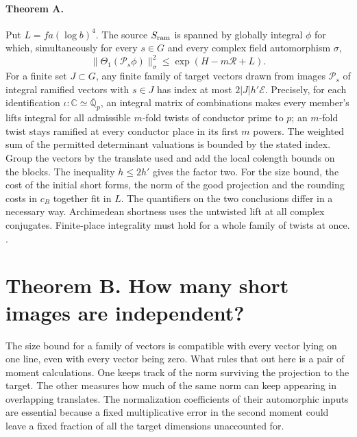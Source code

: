 \paragraph{Theorem A.} Put \(L=fa(\log b)^4\). The source \(S_{\rm ram}\) is spanned by globally integral \(\phi\) for which, simultaneously for every \(s\in G\) and every complex field automorphism \(\sigma\),
\begin{equation}\label{eq:bridge-short}
              \|\Theta_1(\mathcal P_s\phi)\|_\sigma^2
                        \le \exp(H-m\mathcal R+L).
\end{equation}
For a finite set \(J\subset G\), any finite family of target vectors drawn from images \(\mathcal P_s\) of integral ramified vectors with \(s\in J\) has index at most \(2|J|h'\mathcal E\). Precisely, for each identification \(\iota:\mathbb C\simeq\overline{\mathbb Q}_p\), an integral matrix of combinations makes every member's lifts integral for all admissible \(m\)-fold twists of conductor prime to \(p\); an \(m\)-fold twist stays ramified at every conductor place in its first \(m\) powers. The weighted sum of the permitted determinant valuations is bounded by the stated index. Group the vectors by the translate used and add the local colength bounds on the blocks. The inequality \(h\le2h'\) gives the factor two. For the size bound, the cost of the initial short forms, the norm of the good projection and the rounding costs in \(c_B\) together fit in \(L\). The quantifiers on the two conclusions differ in a necessary way. Archimedean shortness uses the untwisted lift at all complex conjugates. Finite-place integrality must hold for a whole family of twists at once. .

\section{Theorem B. How many short images are independent?}\label{sec:bridge-enough}

The size bound for a family of vectors is compatible with every vector lying on one line, even with every vector being zero. What rules that out here is a pair of moment calculations. One keeps track of the norm surviving the projection to the target. The other measures how much of the same norm can keep appearing in overlapping translates. The normalization coefficients of their automorphic inputs are essential because a fixed multiplicative error in the second moment could leave a fixed fraction of all the target dimensions unaccounted for.

